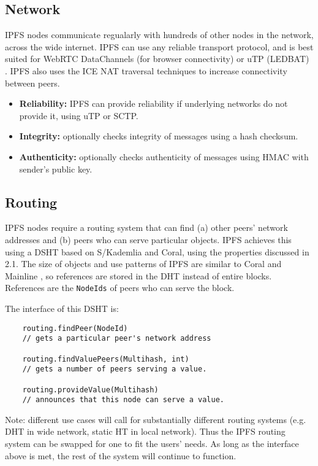 \documentclass{sig-alternate}
\begin{document}
\subsection{Network}

IPFS nodes communicate regualarly with hundreds of other nodes in the network, across the wide internet. IPFS can use any reliable transport protocol, and is best suited for WebRTC DataChannels \cite{WebRTC} (for browser connectivity) or uTP \cite{uTP} (LEDBAT) \cite{LEDBAT}. IPFS also uses the ICE NAT traversal techniques \cite{ICE} to increase connectivity between peers.

\begin{itemize}
  \item \textbf{Reliability:} IPFS can provide reliability if underlying networks do not provide it, using uTP or SCTP.
  \item \textbf{Integrity:} optionally checks integrity of messages using a hash checksum.
  \item \textbf{Authenticity:} optionally checks authenticity of messages using HMAC with sender's public key.
\end{itemize}

\subsection{Routing}

IPFS nodes require a routing system that can find (a) other peers' network addresses and (b) peers who can serve particular objects. IPFS achieves this using a DSHT based on S/Kademlia and Coral, using the properties discussed in 2.1. The size of objects and use patterns of IPFS are similar to Coral \cite{Coral} and Mainline \cite{Mainline}, so references are stored in the DHT instead of entire blocks. References are the \texttt{NodeIds} of peers who can serve the block.

The interface of this DSHT is:

\begin{verbatim}
    routing.findPeer(NodeId)
    // gets a particular peer's network address

    routing.findValuePeers(Multihash, int)
    // gets a number of peers serving a value.

    routing.provideValue(Multihash)
    // announces that this node can serve a value.
\end{verbatim}

Note: different use cases will call for substantially different routing systems (e.g. DHT in wide network, static HT in local network). Thus the IPFS routing system can be swapped for one to fit the users' needs. As long as the interface above is met, the rest of the system will continue to function.
\end{document}
